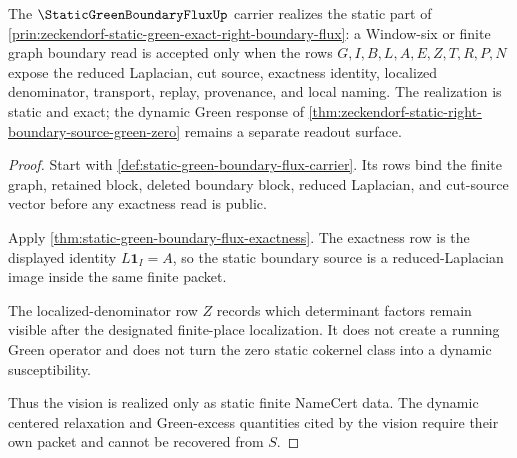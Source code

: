 \begin{theorem}
\label{thm:static-green-boundary-flux-vision-realization}
The $\StaticGreenBoundaryFluxUp$ carrier realizes the static part of \autoref{prin:zeckendorf-static-green-exact-right-boundary-flux}: a Window-six or finite graph boundary read is accepted only when the rows $G,I,B,L,A,E,Z,T,R,P,N$ expose the reduced Laplacian, cut source, exactness identity, localized denominator, transport, replay, provenance, and local naming. The realization is static and exact; the dynamic Green response of \autoref{thm:zeckendorf-static-right-boundary-source-green-zero} remains a separate readout surface.
\end{theorem}
\begin{proof}
Start with \autoref{def:static-green-boundary-flux-carrier}. Its rows bind the finite graph, retained block, deleted boundary block, reduced Laplacian, and cut-source vector before any exactness read is public.

Apply \autoref{thm:static-green-boundary-flux-exactness}. The exactness row is the displayed identity $L\mathbf{1}_I=A$, so the static boundary source is a reduced-Laplacian image inside the same finite packet.

The localized-denominator row $Z$ records which determinant factors remain visible after the designated finite-place localization. It does not create a running Green operator and does not turn the zero static cokernel class into a dynamic susceptibility.

Thus the vision is realized only as static finite NameCert data. The dynamic centered relaxation and Green-excess quantities cited by the vision require their own packet and cannot be recovered from $S$.
\end{proof}



